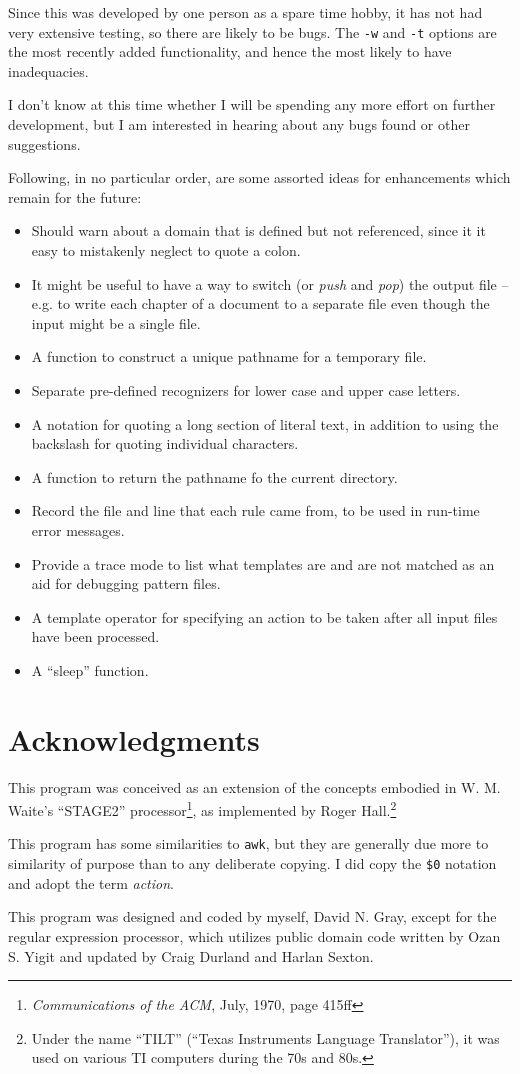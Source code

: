 Since this was developed by one person as a spare time hobby, it has not
had very extensive testing, so there are likely to be bugs.  The
\verb/-w/ and \verb/-t/ options are the most recently added
functionality, and hence the most likely to have inadequacies.

I don't know at this time whether I will be spending any more effort on
further development, but I am interested in hearing about any bugs found
or other suggestions.

Following, in no particular order, are some assorted ideas for
enhancements which remain for the future:
\begin{itemize}
\item Should warn about a domain that is defined but not referenced,
since it it easy to mistakenly neglect to quote a colon.
\item It might be useful to have a way to switch 
(or {\em push} and {\em pop}) the output
file -- e.g. to write each chapter of a document to a separate file
even though the input might be a single file.
\item A function to construct a unique pathname for a temporary file.
\item Separate pre-defined recognizers for lower case and upper case letters.
\item A notation for quoting a long section of
literal text, in addition to using the backslash for quoting individual
characters.
\item A function to return the pathname fo the current directory.
\item Record the file and line that each rule came from, to be used in
run-time error messages.
\item Provide a trace mode to list what
templates are and are not matched as an aid for debugging pattern files.
\item A template operator for specifying an action to be taken after all
input files have been processed.
\item A ``sleep'' function.
\end{itemize}

\section{Acknowledgments}

This program was conceived as an extension of the concepts
embodied in W. M. Waite's ``STAGE2'' processor\footnote{{\em
Communications of the ACM}, July, 1970, page 415ff}, as implemented by
Roger Hall.\footnote{Under the name ``TILT'' (``Texas Instruments
Language Translator''), it was used on various TI computers during the
70s and 80s.}

This program has some similarities to {\tt awk}, but
they are generally due more to similarity of purpose than to any
deliberate copying.  I did copy the \verb/$0/ notation and adopt the term
{\em action}.

This program was designed and coded by myself, David N. Gray, except for the
regular expression processor, which utilizes public domain code written
by Ozan S. Yigit and updated by Craig Durland and Harlan Sexton.
